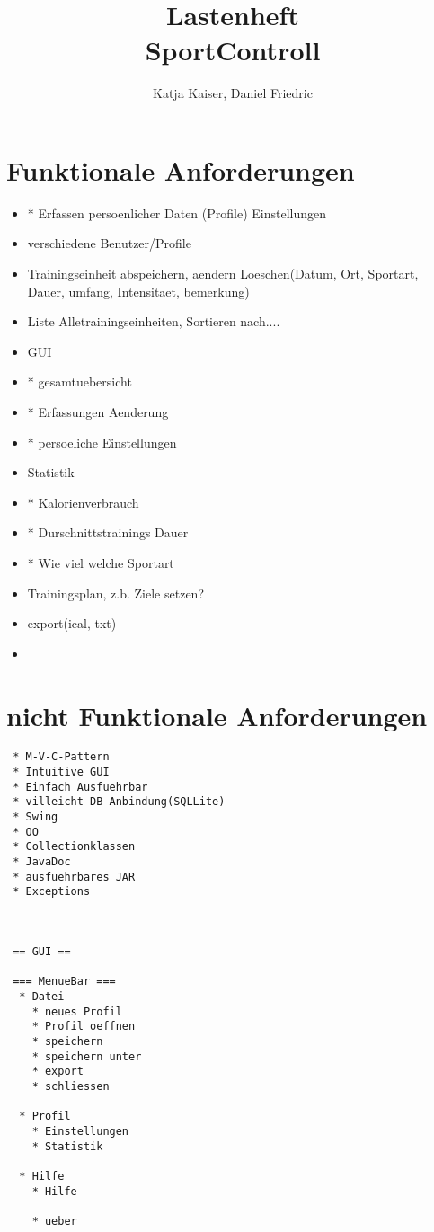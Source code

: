 \documentclass[12pt,a4paper]{article}
\author{Katja Kaiser, Daniel Friedric}
\title{Lastenheft \\ SportControll}
\begin{document}
\maketitle



\section{Funktionale Anforderungen}
\begin{itemize}

\item* Erfassen persoenlicher Daten (Profile) Einstellungen
\item verschiedene Benutzer/Profile
\item Trainingseinheit abspeichern, aendern Loeschen(Datum, Ort, Sportart, Dauer, umfang, Intensitaet, bemerkung)
\item Liste Alletrainingseinheiten, Sortieren nach....
\item GUI 
	
	\item 	* gesamtuebersicht
 	\item  * Erfassungen Aenderung
	\item 	* persoeliche Einstellungen
\item  Statistik
	 \item	* Kalorienverbrauch
	 \item	* Durschnittstrainings Dauer
	 \item	* Wie viel welche Sportart
 	 
\item Trainingsplan, z.b. Ziele setzen?
\item export(ical, txt)
\item 
\end{itemize} 





\section{nicht Funktionale Anforderungen}
\begin{verbatim}
 * M-V-C-Pattern
 * Intuitive GUI
 * Einfach Ausfuehrbar
 * villeicht DB-Anbindung(SQLLite)
 * Swing
 * OO
 * Collectionklassen
 * JavaDoc
 * ausfuehrbares JAR
 * Exceptions
 
 
 
 == GUI ==
 
 === MenueBar ===
  * Datei
    * neues Profil
  	* Profil oeffnen
  	* speichern
  	* speichern unter
  	* export
  	* schliessen
  	
  * Profil
  	* Einstellungen
  	* Statistik
  	
  * Hilfe
  	* Hilfe

  	* ueber
  	
  	\end{verbatim}
\end{document}
